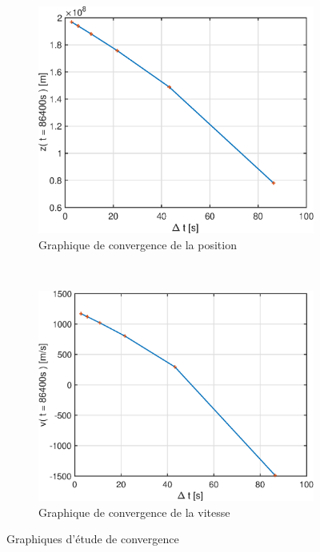 \documentclass[a4paper,12pt,twoside]{article}
\begin{document}
\begin{figure}[h]
	\centering
	\begin{subfigure}[b]{0.45\textwidth}
		\includegraphics[width=\textwidth]{graphs/zConvA.eps}
		\caption{Graphique de convergence de la position}
		\label{fig:A-zConv}
	\end{subfigure}
	~
	\begin{subfigure}[b]{0.45\textwidth}
		\includegraphics[width=\textwidth]{graphs/vConvA.eps}
		\caption{Graphique de convergence de la vitesse}
		\label{fig:A-vConv}
	\end{subfigure}
	\caption{Graphiques d'étude de convergence}
	\label{fig:A-conv}
\end{figure}
\end{document}
